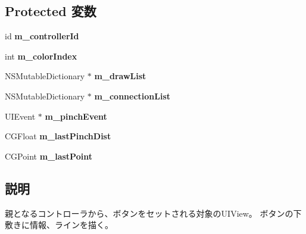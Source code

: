 \subsection*{Protected 変数}
\begin{DoxyCompactItemize}
\item 
\hypertarget{interface_messenger_display_view_aa560737c094fbfbca64d1a52724a307e}{
id {\bfseries m\_\-controllerId}}
\label{d8/d39/interface_messenger_display_view_aa560737c094fbfbca64d1a52724a307e}

\item 
\hypertarget{interface_messenger_display_view_a9329c2b1bc22938abd84560c9a66c89d}{
int {\bfseries m\_\-colorIndex}}
\label{d8/d39/interface_messenger_display_view_a9329c2b1bc22938abd84560c9a66c89d}

\item 
\hypertarget{interface_messenger_display_view_a34409905c6603a9a5084c5248cb3fc2a}{
NSMutableDictionary $\ast$ {\bfseries m\_\-drawList}}
\label{d8/d39/interface_messenger_display_view_a34409905c6603a9a5084c5248cb3fc2a}

\item 
\hypertarget{interface_messenger_display_view_a0b6812fc7734e00008e374c06475511b}{
NSMutableDictionary $\ast$ {\bfseries m\_\-connectionList}}
\label{d8/d39/interface_messenger_display_view_a0b6812fc7734e00008e374c06475511b}

\item 
\hypertarget{interface_messenger_display_view_a1784971ff728fd49f87867555f0d13f9}{
UIEvent $\ast$ {\bfseries m\_\-pinchEvent}}
\label{d8/d39/interface_messenger_display_view_a1784971ff728fd49f87867555f0d13f9}

\item 
\hypertarget{interface_messenger_display_view_a6b0dad3517ee8881c3d4e50c3a130054}{
CGFloat {\bfseries m\_\-lastPinchDist}}
\label{d8/d39/interface_messenger_display_view_a6b0dad3517ee8881c3d4e50c3a130054}

\item 
\hypertarget{interface_messenger_display_view_a13352f8ffc249726f73fcce007df21d0}{
CGPoint {\bfseries m\_\-lastPoint}}
\label{d8/d39/interface_messenger_display_view_a13352f8ffc249726f73fcce007df21d0}

\end{DoxyCompactItemize}


\subsection{説明}
親となるコントローラから、ボタンをセットされる対象のUIView。 ボタンの下敷きに情報、ラインを描く。 

